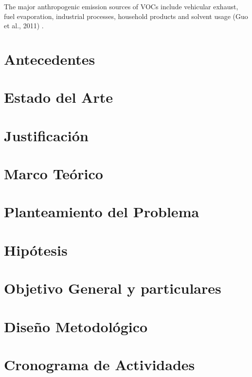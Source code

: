 \documentclass[10pt]{article}
\begin{document}
The major anthropogenic emission sources of VOCs include vehicular exhaust, fuel evaporation, industrial processes, household products and solvent usage (Guo et al., 2011) \cite{Guo2017}.

\section{Antecedentes}\label{sec:antecedentes}

\section{Estado del Arte}\label{sec:estado_arte}

\section{Justificación}\label{sec:justificacion}

\section{Marco Teórico}\label{sec:marco_teorico}

\section{Planteamiento del Problema}\label{sec:planteamiento}

\section{Hipótesis}\label{sec:hipotesis}

\section{Objetivo General y particulares}\label{sec:objetivos}

\section{Diseño Metodológico}\label{metodologia}

\section{Cronograma de Actividades}\label{sec:cronograma}



\end{document}
